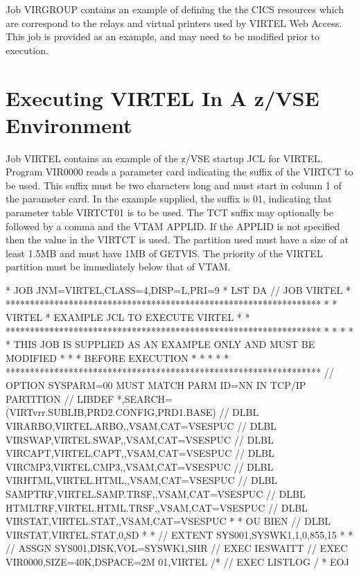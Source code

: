 \documentclass[letterpaper,10pt,english]{sphinxmanual}
\begin{document}
\sphinxAtStartPar
Job VIRGROUP contains an example of defining the the CICS resources which are correspond to the relays and virtual printers used by VIRTEL Web Access. This job is provided as an example, and may need to be modified prior to execution.


\section{Executing VIRTEL In A z/VSE Environment}
\label{\detokenize{Installation_Guide:executing-virtel-in-a-z-vse-environment}}
\sphinxAtStartPar
Job VIRTEL contains an example of the z/VSE startup JCL for VIRTEL. Program VIR0000 reads a parameter card indicating the suffix of the VIRTCT to be used. This suffix must be two characters long and must start in column 1 of the parameter card. In the example supplied, the suffix is 01, indicating that parameter table VIRTCT01 is to be used. The TCT suffix may optionally be followed by a comma and the VTAM APPLID. If the APPLID is not specified then the value in the VIRTCT is used. The partition used must have a size of at least 1.5MB and must have 1MB of GETVIS. The priority of the VIRTEL partition must be immediately below that of VTAM.

\begin{sphinxVerbatim}[commandchars=\\\{\}]
* \PYGZdl{}\PYGZdl{} JOB JNM=VIRTEL,CLASS=4,DISP=L,PRI=9
* \PYGZdl{}\PYGZdl{} LST DA
// JOB VIRTEL
* *****************************************************************
* * VIRTEL * EXAMPLE JCL TO EXECUTE VIRTEL *
* *****************************************************************
* * *
* * THIS JOB IS SUPPLIED AS AN EXAMPLE ONLY AND MUST BE MODIFIED *
* * BEFORE EXECUTION *
* * *
* *****************************************************************
// OPTION SYSPARM=\PYGZsq{}00\PYGZsq{} MUST MATCH PARM ID=NN IN TCP/IP PARTITION
// LIBDEF *,SEARCH=(VIRTvrr.SUBLIB,PRD2.CONFIG,PRD1.BASE)
// DLBL VIRARBO,\PYGZsq{}VIRTEL.ARBO\PYGZsq{},,VSAM,CAT=VSESPUC
// DLBL VIRSWAP,\PYGZsq{}VIRTEL.SWAP\PYGZsq{},,VSAM,CAT=VSESPUC
// DLBL VIRCAPT,\PYGZsq{}VIRTEL.CAPT\PYGZsq{},,VSAM,CAT=VSESPUC
// DLBL VIRCMP3,\PYGZsq{}VIRTEL.CMP3\PYGZsq{},,VSAM,CAT=VSESPUC
// DLBL VIRHTML,\PYGZsq{}VIRTEL.HTML\PYGZsq{},,VSAM,CAT=VSESPUC
// DLBL SAMPTRF,\PYGZsq{}VIRTEL.SAMP.TRSF\PYGZsq{},,VSAM,CAT=VSESPUC
// DLBL HTMLTRF,\PYGZsq{}VIRTEL.HTML.TRSF\PYGZsq{},,VSAM,CAT=VSESPUC
// DLBL VIRSTAT,\PYGZsq{}VIRTEL.STAT\PYGZsq{},,VSAM,CAT=VSESPUC
* * OU BIEN // DLBL VIRSTAT,\PYGZsq{}VIRTEL.STAT\PYGZsq{},0,SD
* * // EXTENT SYS001,SYSWK1,1,0,855,15
* * // ASSGN SYS001,DISK,VOL=SYSWK1,SHR
// EXEC IESWAITT
// EXEC VIR0000,SIZE=40K,DSPACE=2M
01,VIRTEL
/*
// EXEC LISTLOG
/\PYGZam{}
* \PYGZdl{}\PYGZdl{} EOJ
\end{sphinxVerbatim}
\end{document}
